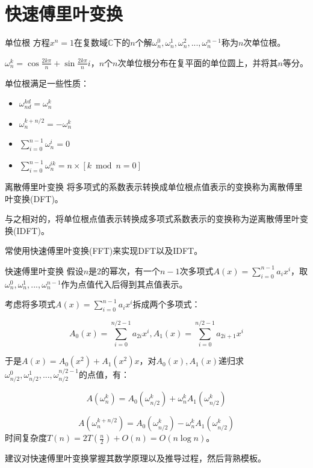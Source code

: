 \documentclass{beamer}
\begin{document}
	\section{快速傅里叶变换}
	\begin{frame}{单位根}
		方程$x^n=1$在复数域$\mathbb{C}$下的$n$个解$\omega_n^0, \omega_n^1, \omega_n^2,..., \omega_n^{n-1}$称为$n$次单位根。
		
		$\omega_n^k=\cos\frac{2k\pi}{n}+\sin\frac{2k\pi}{n}i$，$n$个$n$次单位根分布在复平面的单位圆上，并将其$n$等分。
		
		单位根满足一些性质：
		
		\begin{itemize}
			\item $\omega_{nd}^{kd}=\omega_n^k$
			\item $\omega_n^{k+n/2}=-\omega_{n}^k$
			\item $\sum_{i=0}^{n-1}\omega_n^i=0$
			\item $\sum_{i=0}^{n-1}\omega_n^{ik}=n \times [k \bmod n = 0]$
		\end{itemize}
	\end{frame}
	\begin{frame}{离散傅里叶变换}
		将多项式的系数表示转换成单位根点值表示的变换称为离散傅里叶变换(DFT)。
		
		与之相对的，将单位根点值表示转换成多项式系数表示的变换称为逆离散傅里叶变换(IDFT)。
		
		常使用快速傅里叶变换(FFT)来实现DFT以及IDFT。
	\end{frame}
	\begin{frame}{快速傅里叶变换}
		假设$n$是$2$的幂次，有一个$n-1$次多项式$A(x)=\sum_{i=0}^{n-1}a_ix^i$，取$\omega_n^0, \omega_n^1, ..., \omega_n^{n-1}$作为点值代入后得到其点值表示。
		
		考虑将多项式$A(x)=\sum_{i=0}^{n-1}a_ix^i$拆成两个多项式：
		
		$$A_0(x)=\sum_{i=0}^{n/2-1}a_{2i}x^i,A_1(x)=\sum_{i=0}^{n/2-1}a_{2i+1}x^i$$
		
		于是$A(x)=A_0(x^2)+A_1(x^2)x$，对$A_0(x),A_1(x)$递归求$\omega_{n/2}^0, \omega_{n/2}^1, ..., \omega_{n/2}^{{n/2}-1}$的点值，有：
		
		$$A(\omega_n^k)=A_0(\omega_{n/2}^k)+\omega_n^kA_1(\omega_{n/2}^k)$$
		
		$$A(\omega_n^{k+n/2})=A_0(\omega_{n/2}^k)-\omega_n^kA_1(\omega_{n/2}^k)$$
		时间复杂度$T(n)=2T(\frac n2)+O(n)=O(n\log n)$。
		
		建议对快速傅里叶变换掌握其数学原理以及推导过程，然后背熟模板。
		
	\end{frame}
\end{document}
